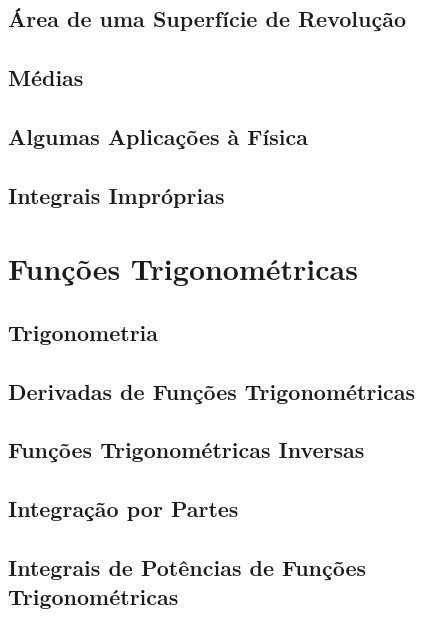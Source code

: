 \documentclass{svmono}
\begin{document}
\section{Área de uma Superfície de Revolução}
\label{sec:arearev}

\section{Médias}
\label{sec:averages}

\section{Algumas Aplicações à Física}
\label{sec:physics}

\section{Integrais Impróprias}
\label{sec:improperints}

\chapterproblems

\chapter{Funções Trigonométricas}
\label{chp:trigfunc}

\section{Trigonometria}
\label{sec:trigonometry}

\section{Derivadas de Funções Trigonométricas}
\label{sec:derivtrig}

\section{Funções Trigonométricas Inversas}
\label{sec:invtrig}

\section{Integração por Partes}
\label{sec:intparts}

\section{Integrais de Potências de Funções Trigonométricas}
\label{sec:intpowtrig}
\end{document}
